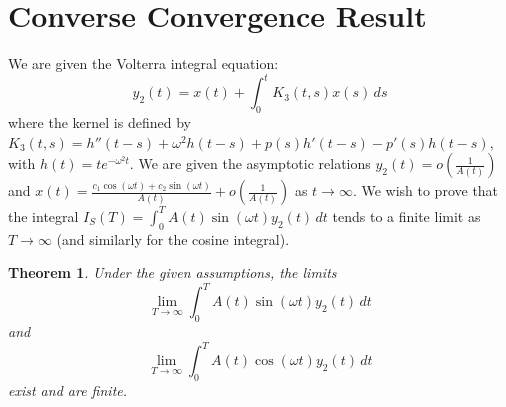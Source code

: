 \documentclass[10pt,reqno]{amsart}
\newtheorem{theorem}{Theorem}
\theoremstyle{definition}
\begin{document}
	\section*{Converse Convergence Result}
	
	We are given the Volterra integral equation:
	\[ y_2(t) = x(t) + \int_0^t K_3(t, s) x(s) \, ds \]
	where the kernel is defined by $K_3(t, s) = h''(t-s) + \omega^2 h(t-s) + p(s)h'(t-s) - p'(s)h(t-s)$, with $h(t) = t e^{-\omega^2 t}$. We are given the asymptotic relations $y_2(t) = o\left(\frac{1}{A(t)}\right)$ and $x(t) = \frac{c_1 \cos(\omega t) + c_2 \sin(\omega t)}{A(t)} + o\left(\frac{1}{A(t)}\right)$ as $t \to \infty$. We wish to prove that the integral $I_S(T) = \int_0^T A(t)\sin(\omega t) y_2(t)\,dt$ tends to a finite limit as $T \to \infty$ (and similarly for the cosine integral).
	
	\vspace{0.5cm}
	
	\begin{theorem}
		Under the given assumptions, the limits $$\lim_{T \to \infty} \int_0^T A(t)\sin(\omega t) y_2(t)\,dt$$ and $$\lim_{T \to \infty} \int_0^T A(t)\cos(\omega t) y_2(t)\,dt$$ exist and are finite.
	\end{theorem}
	
\end{document}
